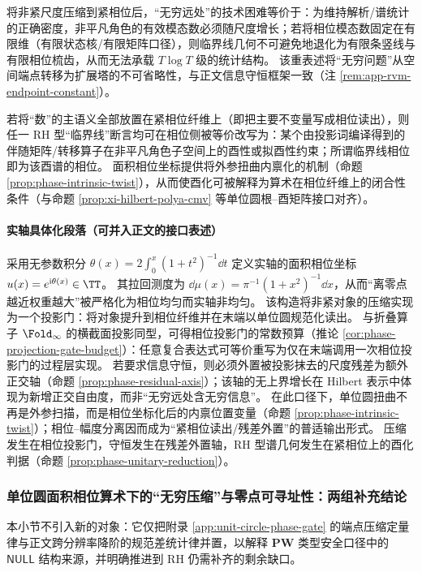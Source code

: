\begin{proposition}[无穷问题的模态预算重表述]\label{prop:phase-infinity-modal-budget}
将非紧尺度压缩到紧相位后，“无穷远处”的技术困难等价于：为维持解析/谱统计的正确密度，非平凡角色的有效模态数必须随尺度增长；若将相位模态数固定在有限维（有限状态核/有限矩阵口径），则临界线几何不可避免地退化为有限条竖线与有限相位梳齿，从而无法承载 \(T\log T\) 级的统计结构。
该重表述将“无穷问题”从空间端点转移为扩展塔的不可省略性，与正文信息守恒框架一致（注 \ref{rem:app-rvm-endpoint-constant}）。
\end{proposition}

\begin{proposition}[相位算术的酉化归约]\label{prop:phase-unitary-reduction}
若将“数”的主语义全部放置在紧相位纤维上（即把主要不变量写成相位读出），则任一 RH 型“临界线”断言均可在相位侧被等价改写为：某个由投影词编译得到的伴随矩阵/转移算子在非平凡角色子空间上的酉性或拟酉性约束；所谓临界线相位即为该酉谱的相位。
面积相位坐标提供将外参扭曲内禀化的机制（命题 \ref{prop:phase-intrinsic-twist}），从而使酉化可被解释为算术在相位纤维上的闭合性条件（与命题 \ref{prop:xi-hilbert-polya-cmv} 等单位圆根–酉矩阵接口对齐）。
\end{proposition}

\paragraph{实轴具体化段落（可并入正文的接口表述）}
采用无参数积分 \(\theta(x)=2\int_0^x (1+t^2)^{-1}\dd t\) 定义实轴的面积相位坐标 \(u(x)=e^{\mathrm{i}\theta(x)}\in\TT\)。
其拉回测度为 \(\dd\mu(x)=\pi^{-1}(1+x^2)^{-1}\dd x\)，从而“离零点越近权重越大”被严格化为相位均匀而实轴非均匀。
该构造将非紧对象的压缩实现为一个投影门：将对象提升到相位纤维并在末端以单位圆规范化读出。
与折叠算子 \(\Fold_\infty\) 的横截面投影同型，可得相位投影门的常数预算（推论 \ref{cor:phase-projection-gate-budget}）：任意复合表达式可等价重写为仅在末端调用一次相位投影门的过程层实现。
若要求信息守恒，则必须外置被投影抹去的尺度残差为额外正交轴（命题 \ref{prop:phase-residual-axis}）；该轴的无上界增长在 Hilbert 表示中体现为新增正交自由度，而非“无穷远处含无穷信息”。
在此口径下，单位圆扭曲不再是外参扫描，而是相位坐标化后的内禀位置变量（命题 \ref{prop:phase-intrinsic-twist}）；相位–幅度分离因而成为“紧相位读出/残差外置”的普适输出形式。
压缩发生在相位投影门，守恒发生在残差外置轴，RH 型谱几何发生在紧相位上的酉化判据（命题 \ref{prop:phase-unitary-reduction}）。

\subsubsection{单位圆面积相位算术下的“无穷压缩”与零点可寻址性：两组补充结论}\label{subsubsec:unit-circle-phase-infty-compression-addressability}
本小节不引入新的对象：它仅把附录 \ref{app:unit-circle-phase-gate} 的端点压缩定量律与正文跨分辨率降阶的规范差统计律并置，以解释 \(\mathbf{PW}\) 类型安全口径中的 \(\mathsf{NULL}\) 结构来源，并明确推进到 RH 仍需补齐的剩余缺口。

